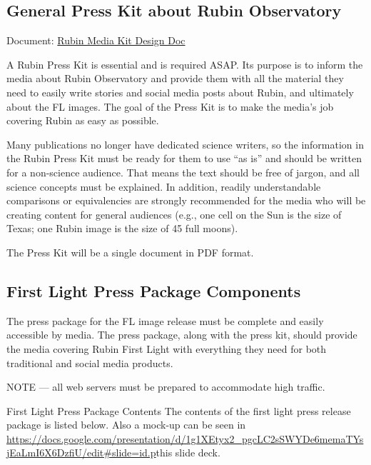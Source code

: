 \subsection{General Press Kit about Rubin Observatory}
Document: \href{https://docs.google.com/document/d/1aFM2bdE-ogtjh63nyE-UTsOtcQC9Ybis1s3LjQipL1Y/edit}{Rubin Media Kit Design Doc}

A Rubin Press Kit is essential and is required ASAP. Its purpose is to inform the media about Rubin Observatory and provide them with all the material they need to easily write stories and social media posts about Rubin, and ultimately about the FL images. The goal of the Press Kit is to make the media’s job covering Rubin as easy as possible.

Many publications no longer have dedicated science writers, so the information in the Rubin Press Kit must be ready for them to use “as is” and should be written for a non-science audience. That means the text should be free of jargon, and all science concepts must be explained. In addition, readily understandable comparisons or equivalencies are strongly recommended for the media who will be creating content for general audiences (e.g., one cell on the Sun is the size of Texas; one Rubin image is the size of 45 full moons).

The Press Kit will be a single document in PDF format.

\subsection{First Light Press Package Components}

The press package for the FL image release must be complete and easily accessible by media. The press package, along with the press kit, should provide the media covering Rubin First Light with everything they need for both traditional and social media products.

NOTE — all web servers must be prepared to accommodate high traffic.

First Light Press Package Contents
The contents of the first light press release package is listed below. Also a mock-up can be seen in \url{https://docs.google.com/presentation/d/1g1XEtyx2_pgcLC2sSWYDe6memaTYsjEaLmI6X6DzfiU/edit#slide=id.p}{this slide deck}.

